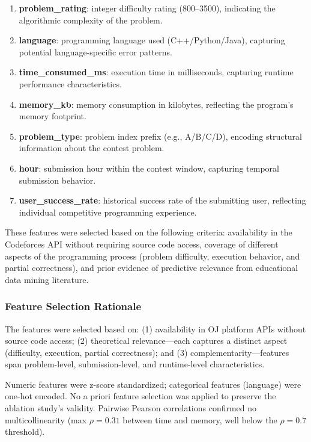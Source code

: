 \documentclass[10pt,letterpaper]{article}
\begin{document}
\begin{enumerate}
    \item \textbf{problem\_rating}: integer difficulty rating (800--3500),
          indicating the algorithmic complexity of the problem.
    \item \textbf{language}: programming language used (C++/Python/Java),
          capturing potential language-specific error patterns.
    \item \textbf{time\_consumed\_ms}: execution time in milliseconds,
          capturing runtime performance characteristics.
    \item \textbf{memory\_kb}: memory consumption in kilobytes, reflecting
          the program's memory footprint.
    \item \textbf{problem\_type}: problem index prefix (e.g., A/B/C/D), encoding
          structural information about the contest problem.
    \item \textbf{hour}: submission hour within the contest window, capturing
          temporal submission behavior.
    \item \textbf{user\_success\_rate}: historical success rate of the submitting
          user, reflecting individual competitive programming experience.
\end{enumerate}

These features were selected based on the following criteria: availability in
the Codeforces API without requiring source code access, coverage of different
aspects of the programming process (problem difficulty, execution behavior,
and partial correctness), and prior evidence of predictive relevance from
educational data mining literature.

\subsubsection*{Feature Selection Rationale}
The features were selected based on: (1) availability in OJ platform APIs without source code access; (2) theoretical relevance---each captures a distinct aspect (difficulty, execution, partial correctness); and (3) complementarity---features span problem-level, submission-level, and runtime-level characteristics.

Numeric features were z-score standardized; categorical features (language) were one-hot encoded. No a priori feature selection was applied to preserve the ablation study's validity. Pairwise Pearson correlations confirmed no multicollinearity (max $\rho = 0.31$ between time and memory, well below the $\rho = 0.7$ threshold).
\end{document}
